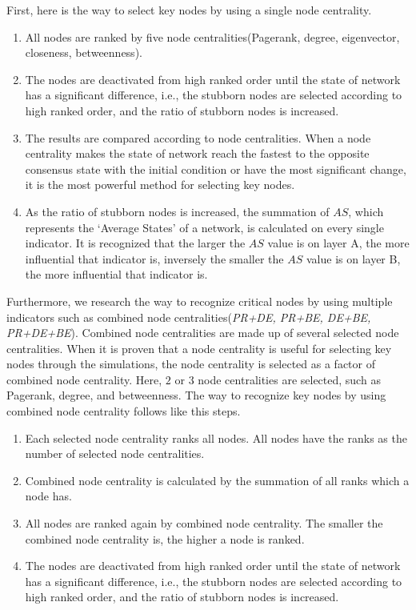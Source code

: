 First, here is the way to select key nodes by using a single node centrality.
\begin{enumerate}
	\item All nodes are ranked by five node centralities(Pagerank, degree, eigenvector, closeness, betweenness).
	\item The nodes are deactivated from high ranked order until the state of network has a significant difference, i.e., the stubborn nodes are selected according to high ranked order, and the ratio of stubborn nodes is increased. 
	\item The results are compared according to node centralities. When a node centrality makes the state of network reach the fastest to the opposite consensus state with the initial condition or have the most significant change, it is the most powerful method for selecting key nodes.
	\item As the ratio of stubborn nodes is increased, the summation of $AS$, which represents the `Average States' of a network, is calculated on every single indicator. It is recognized that the larger the $AS$ value is on layer A, the more influential that indicator is, inversely the smaller the $AS$ value is on layer B, the more influential that indicator is.
\end{enumerate}

Furthermore, we research the way to recognize critical nodes by using multiple indicators such as combined node centralities(\textit{PR+DE, PR+BE, DE+BE, PR+DE+BE}). Combined node centralities are made up of several selected node centralities. When it is proven that a node centrality is useful for selecting key nodes through the simulations, the node centrality is selected as a factor of combined node centrality. Here, $2$ or $3$ node centralities are selected, such as Pagerank, degree, and betweenness. The way to recognize key nodes by using combined node centrality follows like this steps. 

\begin{enumerate}
	\item Each selected node centrality ranks all nodes. All nodes have the ranks as the number of selected node centralities.  
	\item Combined node centrality is calculated by the summation of all ranks which a node has. 
	\item All nodes are ranked again by combined node centrality. The smaller the combined node centrality is, the higher a node is ranked.        
	\item The nodes are deactivated from high ranked order until the state of network has a significant difference, i.e., the stubborn nodes are selected according to high ranked order, and the ratio of stubborn nodes is increased. 
\end{enumerate}

